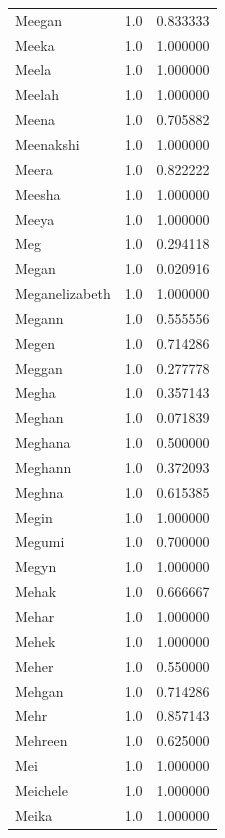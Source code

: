 \documentclass[
  letterpaper,
  DIV=11,
  numbers=noendperiod]{scrreprt}
\begin{document}
\begin{tabular}{lrr}
Meegan          &   1.0 &   0.833333 \\
Meeka           &   1.0 &   1.000000 \\
Meela           &   1.0 &   1.000000 \\
Meelah          &   1.0 &   1.000000 \\
Meena           &   1.0 &   0.705882 \\
Meenakshi       &   1.0 &   1.000000 \\
Meera           &   1.0 &   0.822222 \\
Meesha          &   1.0 &   1.000000 \\
Meeya           &   1.0 &   1.000000 \\
Meg             &   1.0 &   0.294118 \\
Megan           &   1.0 &   0.020916 \\
Meganelizabeth  &   1.0 &   1.000000 \\
Megann          &   1.0 &   0.555556 \\
Megen           &   1.0 &   0.714286 \\
Meggan          &   1.0 &   0.277778 \\
Megha           &   1.0 &   0.357143 \\
Meghan          &   1.0 &   0.071839 \\
Meghana         &   1.0 &   0.500000 \\
Meghann         &   1.0 &   0.372093 \\
Meghna          &   1.0 &   0.615385 \\
Megin           &   1.0 &   1.000000 \\
Megumi          &   1.0 &   0.700000 \\
Megyn           &   1.0 &   1.000000 \\
Mehak           &   1.0 &   0.666667 \\
Mehar           &   1.0 &   1.000000 \\
Mehek           &   1.0 &   1.000000 \\
Meher           &   1.0 &   0.550000 \\
Mehgan          &   1.0 &   0.714286 \\
Mehr            &   1.0 &   0.857143 \\
Mehreen         &   1.0 &   0.625000 \\
Mei             &   1.0 &   1.000000 \\
Meichele        &   1.0 &   1.000000 \\
Meika           &   1.0 &   1.000000 \\

\end{tabular}
\end{document}
